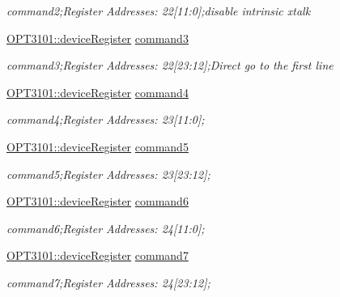 \begin{DoxyCompactItemize}
\begin{DoxyCompactList}\small\item\em command2;Register Addresses\+: 22\mbox{[}11\+:0\mbox{]};disable intrinsic xtalk \end{DoxyCompactList}\item 
\mbox{\hyperlink{class_o_p_t3101_1_1device_register}{O\+P\+T3101\+::device\+Register}} \mbox{\hyperlink{class_o_p_t3101_1_1registers_a89699ece57124e83677abb74fc6e12ed}{command3}}
\begin{DoxyCompactList}\small\item\em command3;Register Addresses\+: 22\mbox{[}23\+:12\mbox{]};Direct go to the first line \end{DoxyCompactList}\item 
\mbox{\hyperlink{class_o_p_t3101_1_1device_register}{O\+P\+T3101\+::device\+Register}} \mbox{\hyperlink{class_o_p_t3101_1_1registers_a6d75c4085fce9ed59248333a9794f598}{command4}}
\begin{DoxyCompactList}\small\item\em command4;Register Addresses\+: 23\mbox{[}11\+:0\mbox{]}; \end{DoxyCompactList}\item 
\mbox{\hyperlink{class_o_p_t3101_1_1device_register}{O\+P\+T3101\+::device\+Register}} \mbox{\hyperlink{class_o_p_t3101_1_1registers_a3bf72d48f4b09c4ae74943640c21e7f2}{command5}}
\begin{DoxyCompactList}\small\item\em command5;Register Addresses\+: 23\mbox{[}23\+:12\mbox{]}; \end{DoxyCompactList}\item 
\mbox{\hyperlink{class_o_p_t3101_1_1device_register}{O\+P\+T3101\+::device\+Register}} \mbox{\hyperlink{class_o_p_t3101_1_1registers_aa0a0ddc43fbfdd673bfd3fd794e6205c}{command6}}
\begin{DoxyCompactList}\small\item\em command6;Register Addresses\+: 24\mbox{[}11\+:0\mbox{]}; \end{DoxyCompactList}\item 
\mbox{\hyperlink{class_o_p_t3101_1_1device_register}{O\+P\+T3101\+::device\+Register}} \mbox{\hyperlink{class_o_p_t3101_1_1registers_a5f75ef646ef57b564c401756f6a32531}{command7}}
\begin{DoxyCompactList}\small\item\em command7;Register Addresses\+: 24\mbox{[}23\+:12\mbox{]}; \end{DoxyCompactList}\item 

\end{DoxyCompactItemize}
